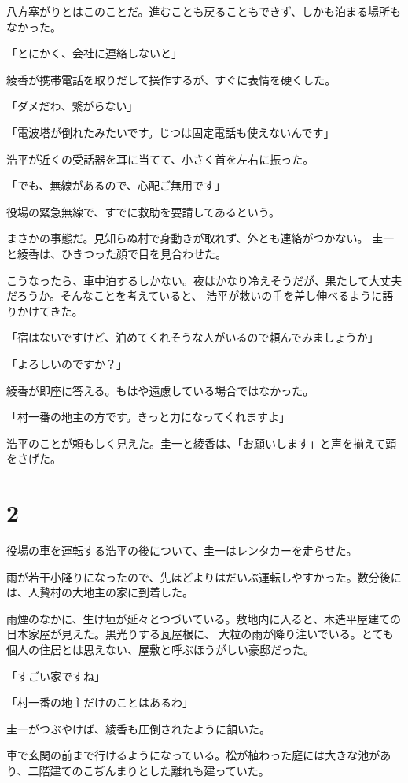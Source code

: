 ﻿\documentclass[book,tate]{jlreq}
\begin{document}
八方塞がりとはこのことだ。進むことも戻ることもできず、しかも泊まる場所もなかった。

「とにかく、会社に連絡しないと」

綾香が携帯電話を取りだして操作するが、すぐに表情を硬くした。

「ダメだわ、繋がらない」

「電波塔が倒れたみたいです。じつは固定電話も使えないんです」

浩平が近くの受話器を耳に当てて、小さく首を左右に振った。

「でも、無線があるので、心配ご無用です」

役場の緊急無線で、すでに救助を要請してあるという。

まさかの事態だ。見知らぬ村で身動きが取れず、外とも連絡がつかない。 圭一と綾香は、ひきつった顔で目を見合わせた。

こうなったら、車中泊するしかない。夜はかなり冷えそうだが、果たして大丈夫だろうか。そんなことを考えていると、 
浩平が救いの手を差し伸べるように語りかけてきた。

「宿はないですけど、泊めてくれそうな人がいるので頼んでみましょうか」

「よろしいのですか？」

綾香が即座に答える。もはや遠慮している場合ではなかった。

「村一番の地主の方です。きっと力になってくれますよ」

浩平のことが頼もしく見えた。圭一と綾香は、「お願いします」と声を揃えて頭をさげた。

\section*{2}

役場の車を運転する浩平の後について、圭一はレンタカーを走らせた。

雨が若干小降りになったので、先ほどよりはだいぶ運転しやすかった。数分後には、人贄村の大地主の家に到着した。 

雨煙のなかに、生け垣が延々とつづいている。敷地内に入ると、木造平屋建ての日本家屋が見えた。黒光りする瓦屋根に、
大粒の雨が降り注いでいる。とても個人の住居とは思えない、屋敷と呼ぶほうがしい豪邸だった。

「すごい家ですね」

「村一番の地主だけのことはあるわ」

圭一がつぶやけば、綾香も圧倒されたように頷いた。

車で玄関の前まで行けるようになっている。松が植わった庭には大きな池があり、二階建てのこぢんまりとした離れも建っていた。
\end{document}
